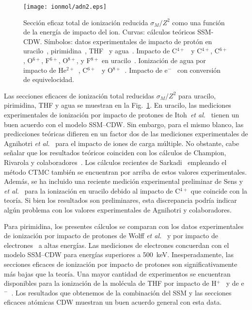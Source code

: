 \begin{figure}
\centering
\texttt{[image: ionmol/adn2.eps]}
\caption[Sección eficaz total de ionización reducida por $Z$ 
(Parte II).]
{Sección eficaz total de ionización reducida $\sigma_{M}/Z^2$ como 
una función de la energía de impacto del ion. 
Curvas: cálculos teóricos SSM-CDW. 
Símbolos: datos experimentales de impacto de protón en 
uracilo~\cite{itoh2013}, 
pirimidina~\cite{wolff2014}, THF~\cite{wang2016} y agua~\cite{Luna2007,
Bolorizadeh86,H_Rudd85,toburen80}. Impacto de C$^{4+}$~\cite{Sens:20} y 
C$^{4+}$, C$^{6+}$, O$^{6+}$, F$^{6+}$, O$^{8+}$, y F$^{8+}$ en 
uracilo~\cite{agnihotri2012,agnihotri2013}. Ionización de agua por 
impacto de He$^{2+}$~\cite{Ohsawa05,He_Rudd85,toburen80}, 
C$^{6+}$~\cite{DalCappello:09,Bhattacharjee:17} y 
O$^{8+}$~\cite{Bhattacharjee:16}. 
Impacto de e$^-$~\cite{bug2017,wolf2019,fuss2009} con conversión de 
equivelocidad.}
\label{fig:crossDNA_2}
\end{figure} 

Las secciones eficaces de ionización total reducidas $\sigma_M/Z^2$ 
para uracilo, pirimidina, THF y agua se muestran en la 
Fig.~\ref{fig:crossDNA_2}. En uracilo, las mediciones experimentales de 
ionización por impacto de protones de 
Itoh~\textit{et al.}~\cite{itoh2013} tienen un buen acuerdo con el 
modelo SSM--CDW. Sin embargo, para el mismo blanco, las predicciones 
teóricas difieren en un factor dos de las mediciones experimentales de 
Agnihotri \textit{et al.}~\cite{agnihotri2012,agnihotri2013} para el 
impacto de iones de carga múltiple. No obstante, cabe señalar que los 
resultados teóricos coinciden con los cálculos de Champion, 
Rivarola y colaboradores~\cite{agnihotri2012,champion2012}. Los cálculos 
recientes de Sarkadi~\cite{sarkadi2016} empleando el método CTMC también 
se encuentran por arriba de estos valores experimentales. Además, se ha 
incluido una reciente medición experimental preliminar de Sens y 
\textit{et al.}~\cite{Sens:20} para la ionización en uracilo debido al 
impacto de C$^{4+}$ que coincide con la teoría. Si bien los resultados 
son preliminares, esta discrepancia podría indicar algún problema con 
los valores experimentales de Agnihotri y colaboradores. 

Para pirimidina, los presentes cálculos se comparan con los datos 
experimentales de ionización por impacto de protones de Wolff 
\textit{et al.}~\cite{wolff2014} y por impacto de 
electrones~\cite{bug2017} a altas energías. Las mediciones de electrones 
concuerdan con el modelo SSM--CDW para energías superiores a 500~keV. 
Inesperadamente, las secciones eficaces de ionización por impacto de 
protones son significativamente más bajas que la teoría. Una mayor 
cantidad de experimentos se encuentran disponibles para la ionización de 
la molécula de THF por impacto de H$^+$~\cite{wang2016} y de 
e$^-$~\cite{bug2017,wolf2019,fuss2009}. Los resultados que obtenemos de 
la combinación del SSM y las secciones eficaces atómicas CDW muestran un 
buen acuerdo general con esta data.

